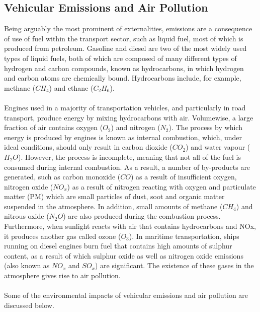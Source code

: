\subsection{Vehicular Emissions and Air Pollution}
Being arguably the most prominent of externalities, emissions are a consequence of use of fuel within the transport sector, such as liquid fuel, most of which is produced from petroleum. Gasoline and diesel are two of the most widely used types of liquid fuels, both of which are composed of many different types of hydrogen and carbon compounds, known as hydrocarbons, in which hydrogen and carbon atoms are chemically bound. Hydrocarbons include, for example, methane ($ CH_4 $) and ethane ($ C_2H_6 $).\\\\
Engines used in a majority of transportation vehicles, and particularly in
road transport, produce energy by mixing hydrocarbons with air. Volumewise, a large fraction of air contains oxygen ($ O_2 $) and nitrogen ($ N_2 $). The process by which energy is produced by engines is known as internal combustion, which, under ideal conditions, should only result in carbon dioxide ($ CO_2 $) and water vapour ($ H_2O $). However, the process is incomplete, meaning that not all of the fuel is consumed during internal combustion. As a result, a number of by-products are generated, such as carbon monoxide ($ CO $) as a result of insufficient oxygen, nitrogen oxide ($ NO_x $) as a result of nitrogen reacting with oxygen and particulate matter (PM) which are small particles of dust, soot and organic matter suspended in the atmosphere. In addition, small amounts of methane ($ CH_4 $) and nitrous oxide ($ N_2O $) are also produced during the combustion process. Furthermore, when sunlight reacts with air that contains hydrocarbons and NOx, it produces another gas called ozone ($ O_3 $). In maritime transportation, ships running on diesel engines burn fuel that contains high amounts of sulphur content, as a result of which sulphur oxide as well as nitrogen oxide emissions (also known as $ NO_x $ and $ SO_x $) are significant. The existence of these gases in the atmosphere gives rise to air pollution.\\\\
Some of the environmental impacts of vehicular emissions and air pollution are
discussed below.
